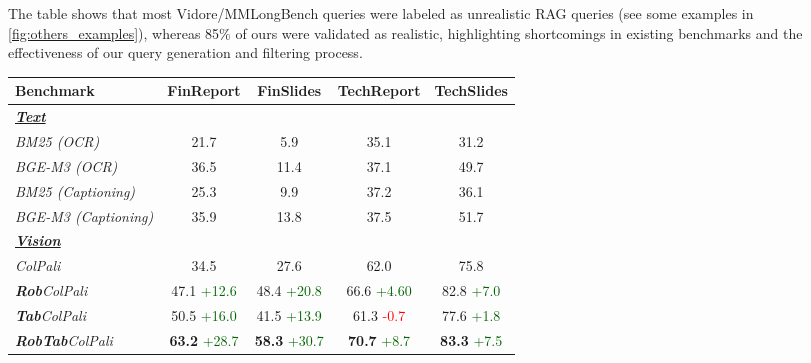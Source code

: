 \vspace{0.15cm}
\noindent
The table shows that most Vidore/MMLongBench queries were labeled as unrealistic RAG queries (see some examples in \cref{fig:others_examples}), whereas 85\% of ours were validated as realistic, highlighting shortcomings in existing benchmarks and the effectiveness of our query generation and filtering process.



\begin{table}[ht!]
\footnotesize
\renewcommand{\arraystretch}{1.5} %
\setlength{\dashlinedash}{0.5pt}
\setlength{\dashlinegap}{0.5pt}
\setlength\tabcolsep{4pt} %

\hspace{-0.15cm}
\begin{tabular}{@{\extracolsep{\fill}}lcccc} 
\toprule
\textbf{Benchmark} & \textbf{FinReport} & \textbf{FinSlides} & \textbf{TechReport} & \textbf{TechSlides}  \\
\midrule
\textbf{\emph{\underline{Text}}} \\
\textit{BM25 (OCR)}    & 21.7 & 5.9 & 35.1 & 31.2   \\
\textit{BGE-M3 (OCR)}  & 36.5 & 11.4 & 37.1 & 49.7  \\
\textit{BM25 (Captioning)}  & 25.3 & 9.9 & 37.2 & 36.1    \\
\textit{BGE-M3 (Captioning)} & 35.9 & 13.8 & 37.5 & 51.7   \\
\midrule
 \underline{\emph{\textbf{Vision}}} \\
\textit{ColPali}  & 34.5 & 27.6 & 62.0 & 75.8  \\
\textit{\textbf{Rob}ColPali}  & 47.1 {\tiny \textcolor{DarkGreen}{+12.6}}  & 48.4 {\tiny \textcolor{DarkGreen}{+20.8}}  & 66.6 {\tiny \textcolor{DarkGreen}{+4.60}}  & 82.8 {\tiny \textcolor{DarkGreen}{+7.0}}  \\
\textit{\textbf{Tab}ColPali}  & 50.5 {\tiny \textcolor{DarkGreen}{+16.0}}  & 41.5 {\tiny \textcolor{DarkGreen}{+13.9}}  & 61.3 {\tiny \textcolor{red}{-0.7}}  & 77.6 {\tiny \textcolor{DarkGreen}{+1.8}}  \\
\textit{\textbf{RobTab}ColPali}  & \textbf{63.2} {\tiny \textcolor{DarkGreen}{+28.7}}  & \textbf{58.3} {\tiny \textcolor{DarkGreen}{+30.7}}  & \textbf{70.7} {\tiny \textcolor{DarkGreen}{+8.7}}  & \textbf{83.3} {\tiny \textcolor{DarkGreen}{+7.5}}  \\

\end{tabular}
\end{table}
